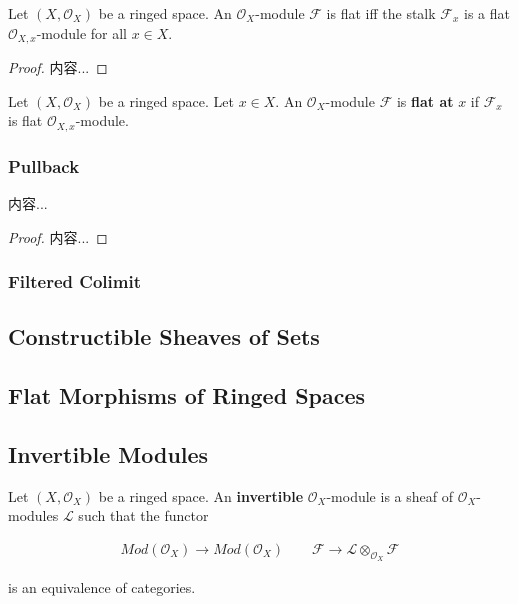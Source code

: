 \documentclass[Total.tex]{subfiles}
\begin{document}
				\begin{lemma}
					Let $(X,\mathcal{O}_X)$ be a ringed space. An $\mathcal{O}_X$-module $\mathcal{F}$ is flat iff the stalk $\mathcal{F}_x$ is a flat $\mathcal{O}_{X,x}$-module for all $x\in X$.
				\end{lemma}
				
				\begin{proof}
					内容...
				\end{proof}
				
				\begin{Def}
					Let $(X,\mathcal{O}_X)$ be a ringed space. Let $x\in X$. An $\mathcal{O}_X$-module $\mathcal{F}$ is \textbf{flat at} $x$ if $\mathcal{F}_x$ is flat $\mathcal{O}_{X,x}$-module.
				\end{Def}
				
				\subsubsection{Pullback}
				
				\begin{lemma}
					内容...
				\end{lemma}
				
				\begin{proof}
					内容...
				\end{proof}
				
				\subsubsection{Filtered Colimit}
			
			\subsection{Constructible Sheaves of Sets}
			
			\subsection{Flat Morphisms of Ringed Spaces}
			
			\subsection{Invertible Modules}
			
			\begin{Def}
				Let $(X,\mathcal{O}_X)$ be a ringed space. An \textbf{invertible} $\mathcal{O}_X$-module is a sheaf of $\mathcal{O}_X$-modules $\mathcal{L}$ such that the functor
				
				\begin{gather*}
					Mod(\mathcal{O}_X)\rightarrow Mod(\mathcal{O}_X)\qquad \mathcal{F}\rightarrow \mathcal{L}\otimes_{\mathcal{O}_X} \mathcal{F}
				\end{gather*}
				
				is an equivalence of categories. 
			\end{Def}
			
\end{document}
